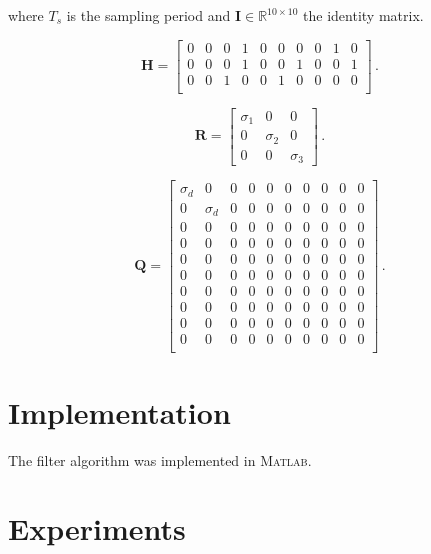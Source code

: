 \noindent
where $T_s$ is the sampling period and $\mathbf{I} \in \mathbb{R}^{10 \times 10}$ the identity matrix.

\begin{equation}
\mathbf{H} = \begin{bmatrix}
  0 & 0 & 0 & 1 & 0 & 0 & 0 & 0 & 1 & 0\\
  0 & 0 & 0 & 1 & 0 & 0 & 1 & 0 & 0 & 1\\
  0 & 0 & 1 & 0 & 0 & 1 & 0 & 0 & 0 & 0\\
\end{bmatrix}\,.
\end{equation}

\begin{equation}
\mathbf{R} = \begin{bmatrix}
  \sigma_1 & 0 & 0\\
  0 & \sigma_2 & 0\\
  0 & 0 & \sigma_3
\end{bmatrix}\,.
\end{equation}

\begin{equation}
\mathbf{Q} = \begin{bmatrix}
  \sigma_d & 0 & 0 & 0 & 0 & 0 & 0 & 0 & 0 & 0\\
  0 & \sigma_d & 0 & 0 & 0 & 0 & 0 & 0 & 0 & 0\\
  0 & 0 & 0 & 0 & 0 & 0 & 0 & 0 & 0 & 0\\
  0 & 0 & 0 & 0 & 0 & 0 & 0 & 0 & 0 & 0\\
  0 & 0 & 0 & 0 & 0 & 0 & 0 & 0 & 0 & 0\\
  0 & 0 & 0 & 0 & 0 & 0 & 0 & 0 & 0 & 0\\
  0 & 0 & 0 & 0 & 0 & 0 & 0 & 0 & 0 & 0\\
  0 & 0 & 0 & 0 & 0 & 0 & 0 & 0 & 0 & 0\\
  0 & 0 & 0 & 0 & 0 & 0 & 0 & 0 & 0 & 0\\
  0 & 0 & 0 & 0 & 0 & 0 & 0 & 0 & 0 & 0\\
\end{bmatrix}\,.
\end{equation}

\section{Implementation}

The filter algorithm was implemented in \textsc{Matlab}\textsuperscript{\textregistered}.

\section{Experiments}

